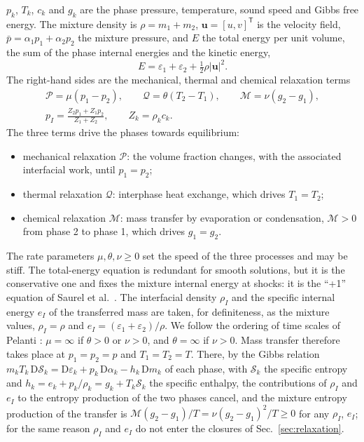 $p_k$, $T_k$, $c_k$ and $g_k$ are the phase pressure, temperature, sound speed and Gibbs free energy. The mixture density is
$\rho=m_1+m_2$, $\mathbf u=[u,v]^{\mathsf T}$ is the velocity field, $\bar p=\alpha_1p_1+\alpha_2p_2$ the mixture pressure, and $E$ the total energy
per unit volume, the sum of the phase internal energies and the kinetic energy,
\begin{equation}
E=\varepsilon_1+\varepsilon_2+\tfrac12\rho|\mathbf u|^2 .
\label{eq:energy}
\end{equation}
The right-hand sides are the mechanical, thermal and chemical relaxation terms
\begin{equation}
\begin{gathered}
\mathcal P=\mu(p_1-p_2),\qquad \mathcal Q=\theta(T_2-T_1),\qquad \mathcal M=\nu(g_2-g_1),\\
p_I=\frac{Z_2p_1+Z_1p_2}{Z_1+Z_2},\qquad Z_k=\rho_kc_k .
\end{gathered}
\label{eq:sources}
\end{equation}
The three terms drive the phases towards equilibrium:
\begin{itemize}
\item mechanical relaxation $\mathcal P$: the volume fraction changes, with the associated interfacial work, until $p_1=p_2$;
\item thermal relaxation $\mathcal Q$: interphase heat exchange, which drives $T_1=T_2$;
\item chemical relaxation $\mathcal M$: mass transfer by evaporation or condensation, $\mathcal M>0$ from phase 2 to
phase 1, which drives $g_1=g_2$.
\end{itemize}
The rate parameters $\mu,\theta,\nu\ge0$ set the speed of the three processes and may be stiff. The total-energy equation is
redundant for smooth solutions, but it is the conservative one and fixes the mixture internal energy at shocks: it is
the ``+1'' equation of Saurel et al.\ \cite{SPB2009}. The interfacial density $\rho_I$ and the specific internal energy $e_I$ of the
transferred mass are taken, for definiteness, as the mixture values, $\rho_I=\rho$ and $e_I=(\varepsilon_1+\varepsilon_2)/\rho$. We follow the
ordering of time scales of Pelanti \cite{Pelanti2022}: $\mu=\infty$ if $\theta>0$ or $\nu>0$, and $\theta=\infty$ if $\nu>0$. Mass transfer
therefore takes place at $p_1=p_2=p$ and $T_1=T_2=T$. There, by the Gibbs relation
$m_kT_k\,\mathrm D\mathcal S_k=\mathrm D\varepsilon_k+p_k\,\mathrm D\alpha_k-h_k\,\mathrm Dm_k$ of each phase, with $\mathcal S_k$ the
specific entropy and $h_k=e_k+p_k/\rho_k=g_k+T_k\mathcal S_k$ the specific enthalpy, the contributions of $\rho_I$ and $e_I$ to the entropy
production of the two phases cancel, and the mixture entropy production of the transfer is
$\mathcal M(g_2-g_1)/T=\nu(g_2-g_1)^2/T\ge0$ for any $\rho_I$, $e_I$; for the same reason $\rho_I$ and $e_I$ do not enter the closures of
Sec.~\ref{sec:relaxation}.

